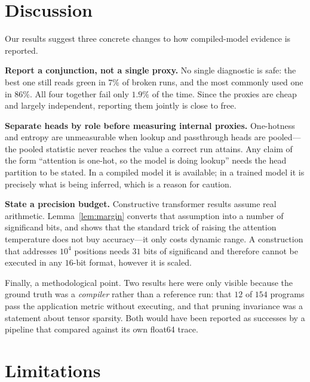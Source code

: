 \documentclass{article}
\theoremstyle{definition}
\begin{document}
\section{Discussion}\label{sec:discussion}

Our results suggest three concrete changes to how compiled-model evidence is
reported.

\textbf{Report a conjunction, not a single proxy.} No single diagnostic is safe:
the best one still reads green in $7\%$ of broken runs, and the most commonly
used one in $86\%$. All four together fail only $1.9\%$ of the time. Since the
proxies are cheap and largely independent, reporting them jointly is close to
free.

\textbf{Separate heads by role before measuring internal proxies.} One-hotness
and entropy are unmeasurable when lookup and passthrough heads are pooled---the
pooled statistic never reaches the value a correct run attains. Any claim of the
form ``attention is one-hot, so the model is doing lookup'' needs the head
partition to be stated. In a compiled model it is available; in a trained model
it is precisely what is being inferred, which is a reason for caution.

\textbf{State a precision budget.} Constructive transformer results assume real
arithmetic. Lemma~\ref{lem:margin} converts that assumption into a number of
significand bits, and shows that the standard trick of raising the attention
temperature does not buy accuracy---it only costs dynamic range. A construction
that addresses $10^4$ positions needs $31$ bits of significand and therefore
cannot be executed in any $16$-bit format, however it is scaled.

Finally, a methodological point. Two results here were only visible because the
ground truth was a \emph{compiler} rather than a reference run: that $12$ of
$154$ programs pass the application metric without executing, and that pruning
invariance was a statement about tensor sparsity. Both would have been reported
as successes by a pipeline that compared against its own float64 trace.

\section{Limitations}\label{sec:limitations}
\end{document}

